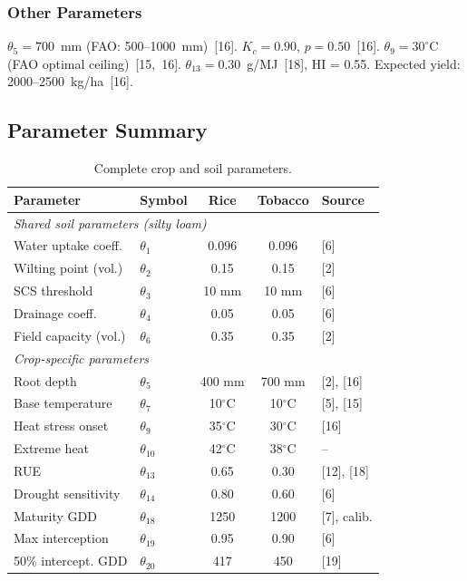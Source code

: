\documentclass[12pt,a4paper]{article}
\begin{document}
\subsubsection{Other Parameters}

$\theta_5 = 700$~mm (FAO: 500--1000~mm)~[16]. $K_c = 0.90$, $p = 0.50$~[16]. $\theta_9 = 30^{\circ}$C (FAO optimal ceiling)~[15,~16]. $\theta_{13} = 0.30$~g/MJ~[18], HI = 0.55. Expected yield: 2000--2500~kg/ha~[16].

\subsection{Parameter Summary}

\begin{table}[H]
\centering
\caption{Complete crop and soil parameters.}
\label{tab:params}
\small
\begin{tabular}{llccl}
\toprule
\textbf{Parameter} & \textbf{Symbol} & \textbf{Rice} & \textbf{Tobacco} & \textbf{Source} \\
\midrule
\multicolumn{5}{l}{\emph{Shared soil parameters (silty loam)}} \\
Water uptake coeff. & $\theta_1$ & 0.096 & 0.096 & [6] \\
Wilting point (vol.) & $\theta_2$ & 0.15 & 0.15 & [2] \\
SCS threshold & $\theta_3$ & 10 mm & 10 mm & [6] \\
Drainage coeff. & $\theta_4$ & 0.05 & 0.05 & [6] \\
Field capacity (vol.) & $\theta_6$ & 0.35 & 0.35 & [2] \\
\midrule
\multicolumn{5}{l}{\emph{Crop-specific parameters}} \\
Root depth & $\theta_5$ & 400 mm & 700 mm & [2], [16] \\
Base temperature & $\theta_7$ & 10$^{\circ}$C & 10$^{\circ}$C & [5], [15] \\
Heat stress onset & $\theta_9$ & 35$^{\circ}$C & 30$^{\circ}$C & [16] \\
Extreme heat & $\theta_{10}$ & 42$^{\circ}$C & 38$^{\circ}$C & -- \\
RUE & $\theta_{13}$ & 0.65 & 0.30 & [12], [18] \\
Drought sensitivity & $\theta_{14}$ & 0.80 & 0.60 & [6] \\
Maturity GDD & $\theta_{18}$ & 1250 & 1200 & [7], calib. \\
Max interception & $\theta_{19}$ & 0.95 & 0.90 & [6] \\
50\% intercept. GDD & $\theta_{20}$ & 417 & 450 & [19] \\

\end{tabular}
\end{table}
\end{document}
